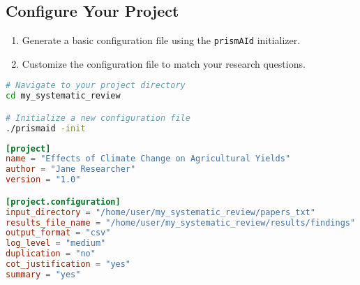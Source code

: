 
\subsection{Configure Your Project}

\begin{enumerate}
    \item Generate a basic configuration file using the \texttt{prismAId} initializer.
    \item Customize the configuration file to match your research questions.
\end{enumerate}

\begin{commandbox}
\begin{lstlisting}[language=Bash]
# Navigate to your project directory
cd my_systematic_review

# Initialize a new configuration file
./prismaid -init
\end{lstlisting}
\end{commandbox}


\begin{configbox}
\begin{lstlisting}[language=TOML]
[project]
name = "Effects of Climate Change on Agricultural Yields"
author = "Jane Researcher"
version = "1.0"

[project.configuration]
input_directory = "/home/user/my_systematic_review/papers_txt"
results_file_name = "/home/user/my_systematic_review/results/findings"
output_format = "csv"
log_level = "medium"
duplication = "no"
cot_justification = "yes"
summary = "yes"
\end{lstlisting}
\end{configbox}


